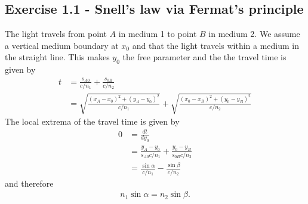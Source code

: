 \documentclass[../main.tex]{subfiles}
\begin{document}
\subsection*{Exercise 1.1 - Snell's law via Fermat's principle}
The light travels from point $A$ in medium 1 to point $B$ in medium 2. We assume a vertical medium boundary at $x_0$ and that the light travels within a medium in the straight line. This makes $y_0$ the free parameter and the the travel time is given by
\begin{align}
    t&=\frac{s_{A0}}{c/n_1}+\frac{s_{0B}}{c/n_2}\\
    &=\sqrt{\frac{(x_A-x_0)^2+(y_A-y_0)^2}{c/n_1}}+\sqrt{\frac{(x_0-x_B)^2+(y_0-y_B)^2}{c/n_2}}
\end{align}
The local extrema of the travel time is given by
\begin{align}
    0&=\frac{dt}{dy_0}\\
    &=\frac{y_A-y_0}{s_{A0}c/n_1}+\frac{y_0-y_B}{s_{0B}c/n_2}\\
    &=\frac{\sin\alpha}{c/n_1}-\frac{\sin\beta}{c/n_2}
\end{align}
and therefore
\begin{align}
n_1\sin\alpha=n_2\sin\beta.
\end{align}
\end{document}
